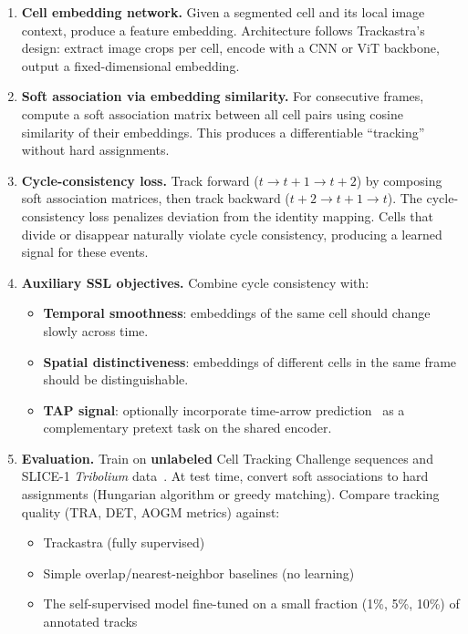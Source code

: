 \documentclass{article}
\begin{document}
\begin{enumerate}
	\item \textbf{Cell embedding network.} Given a segmented cell and its local image context, produce a feature embedding. Architecture follows Trackastra's design: extract image crops per cell, encode with a CNN or ViT backbone, output a fixed-dimensional embedding.

	\item \textbf{Soft association via embedding similarity.} For consecutive frames, compute a soft association matrix between all cell pairs using cosine similarity of their embeddings. This produces a differentiable ``tracking'' without hard assignments.

	\item \textbf{Cycle-consistency loss.} Track forward ($t \to t{+}1 \to t{+}2$) by composing soft association matrices, then track backward ($t{+}2 \to t{+}1 \to t$). The cycle-consistency loss penalizes deviation from the identity mapping. Cells that divide or disappear naturally violate cycle consistency, producing a learned signal for these events.

	\item \textbf{Auxiliary SSL objectives.} Combine cycle consistency with:
	      \begin{itemize}
		      \item \textbf{Temporal smoothness}: embeddings of the same cell should change slowly across time.
		      \item \textbf{Spatial distinctiveness}: embeddings of different cells in the same frame should be distinguishable.
		      \item \textbf{TAP signal}: optionally incorporate time-arrow prediction~\cite{tap} as a complementary pretext task on the shared encoder.
	      \end{itemize}

	\item \textbf{Evaluation.} Train on \textbf{unlabeled} Cell Tracking Challenge sequences and SLICE-1 \textit{Tribolium} data~\cite{slice1}. At test time, convert soft associations to hard assignments (Hungarian algorithm or greedy matching). Compare tracking quality (TRA, DET, AOGM metrics) against:
	      \begin{itemize}
		      \item Trackastra (fully supervised)
		      \item Simple overlap/nearest-neighbor baselines (no learning)
		      \item The self-supervised model fine-tuned on a small fraction (1\%, 5\%, 10\%) of annotated tracks
	      \end{itemize}
\end{enumerate}
\end{document}
